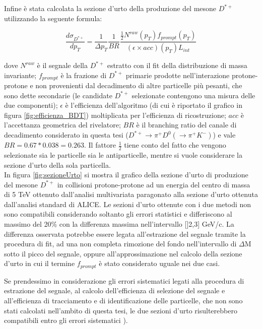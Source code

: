  


Infine è stata calcolata la sezione d'urto  della produzione del mesone $D^{*+}$  utilizzando la seguente formula:

    \begin{equation}
        \frac{d\sigma_{D^{*+}}}{dp_T} = \frac{1}{\Delta p_T} \frac{1}{BR} \frac{\frac{1}{2} N^{raw}(p_T) f_{prompt}(p_T)}{(\epsilon \times acc)(p_T) L_{int}}
    \end{equation}
    
dove $N^{raw}$ è il segnale della $D^{*+}$ estratto con il fit della distribuzione di massa invariante; $f_{prompt}$ è la frazione di $D^{*+}$ primarie prodotte nell'interazione protone-protone e non provenienti dal decadimento di altre particelle più pesanti, che sono dette secondarie (le candidate $D^{*+}$ selezionate contengono una misura delle due componenti); $\epsilon$ è l'efficienza dell'algoritmo (di cui \`e riportato il grafico in figura \ref{fig:efficienza_BDT}) moltiplicata per l'efficienza di ricostruzione; $acc$ è l'accettanza geometrica del rivelatore; $BR$ è il branching ratio del canale di decadimento considerato in questa tesi ($D^{*+} \rightarrow \pi^+ D^0(\rightarrow \pi^+ K^-)$) e vale $BR = 0.67 * 0.038 = 0.263 $. Il fattore $\frac{1}{2}$ tiene conto del fatto che vengono selezionate sia le particelle sia le antiparticelle, mentre si vuole considerare la sezione d'urto della sola particella.  
\\In figura \ref{fig:sezioneUrto} si mostra il grafico della sezione d'urto di produzione del mesone $D^{*+}$ in collisioni protone-protone ad un energia del centro di massa di 5 TeV ottenuto dall'analisi multivariata paragonato alla sezione d'urto ottenuta dall'analisi standard di ALICE. Le sezioni d'urto ottenute con i due metodi non sono compatibili considerando soltanto gli errori statistici e differiscono al massimo del 20\% con la differenza massima nell'intervallo []2,3] GeV/c. 
La differenza osservata potrebbe essere legata all'estrazione del segnale tramite la procedura di fit, ad una non completa rimozione del fondo nell'intervallo di $\Delta$M sotto il picco del segnale, oppure all'approssimazione nel calcolo della sezione d'urto in cui il termine $f_{prompt}$ \`e stato considerato uguale nei due casi. 

Se prendessimo in considerazione gli errori sistematici legati alla procedura di estrazione del segnale, al calcolo dell'efficienza di selezione del segnale e all'efficienza di tracciamento e di identificazione delle particelle, che non sono stati calcolati nell'ambito di questa tesi, le due sezioni d'urto risulterebbero compatibili entro gli errori sistematici \cite{dati_ALICE}).
 
